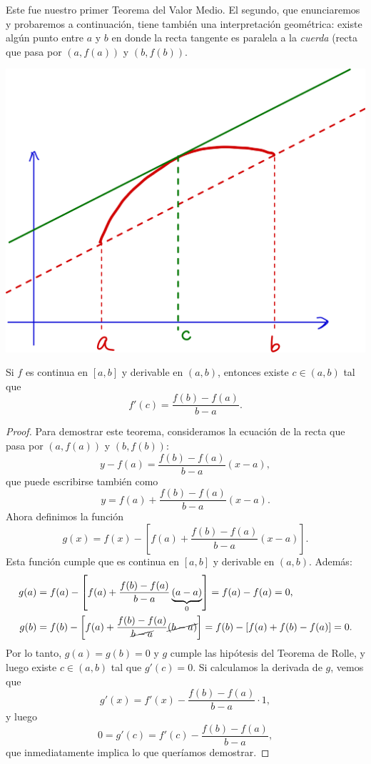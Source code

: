 Este fue nuestro primer Teorema del Valor Medio. El segundo, que enunciaremos y probaremos a continuación, tiene también una interpretación geométrica: existe algún punto entre $a$ y $b$ en donde la recta tangente es paralela a la \emph{cuerda} (recta que pasa por $(a,f(a))$ y $(b,f(b))$.

\medskip
\centerline{\includegraphics[width=.6\textwidth]{pics/tvm.png}}

\begin{theorem}\label{T:TVM}
       Si $f$ es continua en $[a,b]$ y derivable en $(a,b)$, entonces existe $c\in(a,b)$ tal que 
       \[
       f'(c)=\frac{f(b)-f(a)}{b-a}.
       \]
\end{theorem}

\begin{proof}
    Para demostrar este teorema, consideramos la ecuación de la recta  que pasa por $(a,f(a))$ y $(b,f(b))$:
    \[
    y - f(a) = \frac{f(b)-f(a)}{b-a} (x-a),
    \]
    que puede escribirse también como
    \[    
    y = f(a) + \frac{f(b)-f(a)}{b-a} (x-a).
    \]
    Ahora definimos la función 
    \[
    g(x) = f(x) - \left[ f(a) + \frac{f(b)-f(a)}{b-a} (x-a) \right].
    \]
    Esta función cumple que es continua en $[a,b]$ y derivable en $(a,b)$. Además:
    \begin{align*}
        g(a) &= f(a) - \left[ f(a) + \frac{f(b)-f(a)}{b-a} \underbrace{(a-a)}_0 \right] 
        = f(a)-f(a)=0,
        \\
        g(b) &= f(b) - \left[ f(a) + \frac{f(b)-f(a)}{\cancel{b-a}} \cancel{(b-a)} \right] 
        = f(b)-\left[f(a)+f(b)-f(a)\right] = 0.
    \end{align*}
    Por lo tanto, $g(a)=g(b)=0$ y $g$ cumple las hipótesis del Teorema de Rolle, y luego existe $c\in(a,b)$ tal que $g'(c)=0$. 
    Si calculamos la derivada de $g$, vemos que
    \[
    g'(x) = f'(x) - \frac{f(b)-f(a)}{b-a} \cdot 1,
    \]
    y luego 
    \[
    0 = g'(c) = f'(c) - \frac{f(b)-f(a)}{b-a} ,
    \]
    que inmediatamente implica lo que queríamos demostrar.
\end{proof}

